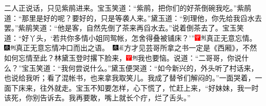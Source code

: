 二人正说话，只见紫鹃进来。宝玉笑道：``紫鹃，把你们的好茶倒碗我吃。''紫鹃道：``那里是好的呢？要好的，只是等袭人来。''黛玉道：``别理他，你先给我舀水去罢。''紫鹃笑道：``他是客，自然先倒了茶来再舀水去。''说着倒茶去了。宝玉笑道：``好丫头，`若共你多情小姐同鸳帐，怎舍得叠被铺床？'''{\includegraphics[width=3mm]{../Images/00002}\includegraphics[width=3mm]{../Images/00011}\footnotesize \kaishu 真正无意忘情。　\includegraphics[width=3mm]{../Images/00004}\includegraphics[width=3mm]{../Images/00011}\footnotesize \kaishu 真正无意忘情冲口而出之语。　\includegraphics[width=3mm]{../Images/00004}\includegraphics[width=3mm]{../Images/00010}\footnotesize \kaishu 方才见芸哥所拿之书一定是《西厢》，不然如何忘情至此？}林黛玉登时撂下脸来，{\includegraphics[width=3mm]{../Images/00002}\includegraphics[width=3mm]{../Images/00011}\footnotesize \kaishu 我也要恼。}说道：``二哥哥，你说什么？''宝玉笑道：``我何尝说什么。''黛玉便哭道：``如今新兴的，外头听了村话来，也说给我听；看了混帐书，也来拿我取笑儿。我成了替爷们解闷的。''一面哭着，一面下床来，往外就走。宝玉不知要怎样，心下慌了，忙赶上来，``好妹妹，我一时该死，你别告诉去。我再要敢，嘴上就长个疔，烂了舌头。''

